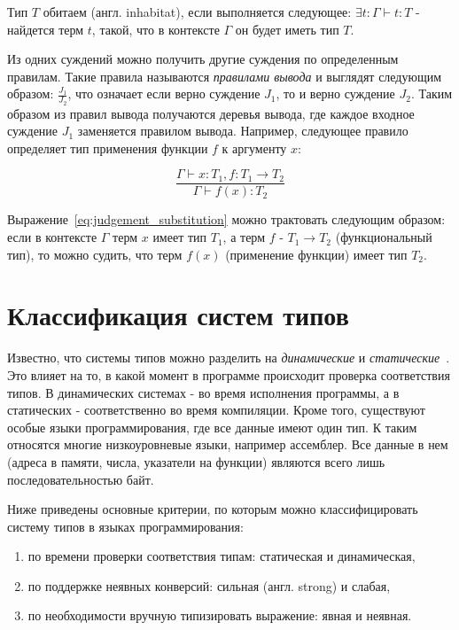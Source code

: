 Тип $T$ обитаем (англ. inhabitat), если выполняется следующее: $\exists t: \Gamma \vdash t: T$ - найдется терм $t$, такой, что в контексте $\Gamma$ он будет иметь тип $T$.

Из одних суждений можно получить другие суждения по определенным правилам.
Такие правила называются \textit{правилами вывода} и выглядят следующим образом: $\displaystyle \frac{J_1}{J_2}$, что означает если верно суждение $J_1$, то и верно суждение $J_2$.
Таким образом из правил вывода получаются деревья вывода, где каждое входное суждение $J_1$ заменяется правилом вывода.
Например, следующее правило определяет тип применения функции $f$ к аргументу $x$:

\begin{equation}
    \label{eq:judgement_substitution}
    \frac{\Gamma \vdash x: T_1, f: T_1 \to T_2}{\Gamma \vdash f(x): T_2}
\end{equation}

Выражение~\ref{eq:judgement_substitution} можно трактовать следующим образом: если в контексте $\Gamma$ терм $x$ имеет тип $T_1$, а терм $f$ - $T_1 \to T_2$ (функциональный тип), то можно судить, что терм $f(x)$ (применение функции) имеет тип $T_2$.


\section{Классификация систем типов}
\label{sec:classification}

Известно, что системы типов можно разделить на \textit{динамические} и \textit{статические}~\cite{Typing}.
Это влияет на то, в какой момент в программе происходит проверка соответствия типов.
В динамических системах - во время исполнения программы, а в статических - соответственно во время компиляции.
Кроме того, существуют особые языки программирования, где все данные имеют один тип.
К таким относятся многие низкоуровневые языки, например ассемблер.
Все данные в нем (адреса в памяти, числа, указатели на функции) являются всего лишь последовательностью байт.

Ниже приведены основные критерии, по которым можно классифицировать систему типов в языках программирования:

\begin{enumerate}[1)]
    \item по времени проверки соответствия типам: статическая и динамическая,
    \item по поддержке неявных конверсий: сильная (англ. strong) и слабая,
    \item по необходимости вручную типизировать выражение: явная и неявная.
\end{enumerate}

